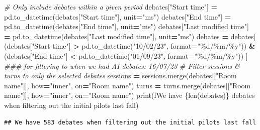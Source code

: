 \documentclass[
]{article}
\newenvironment{Shaded}{\begin{snugshade}}{\end{snugshade}}
\newcommand{\BuiltInTok}[1]{#1}
\newcommand{\CommentTok}[1]{\textcolor[rgb]{0.56,0.35,0.01}{\textit{#1}}}
\newcommand{\NormalTok}[1]{#1}
\newcommand{\OperatorTok}[1]{\textcolor[rgb]{0.81,0.36,0.00}{\textbf{#1}}}
\newcommand{\SpecialCharTok}[1]{\textcolor[rgb]{0.00,0.00,0.00}{#1}}
\newcommand{\SpecialStringTok}[1]{\textcolor[rgb]{0.31,0.60,0.02}{#1}}
\newcommand{\StringTok}[1]{\textcolor[rgb]{0.31,0.60,0.02}{#1}}
\begin{document}
\begin{Shaded}
\begin{Highlighting}[]
\CommentTok{\# Only include debates within a given period}
\NormalTok{debates[}\StringTok{"Start time"}\NormalTok{] }\OperatorTok{=}\NormalTok{ pd.to\_datetime(debates[}\StringTok{"Start time"}\NormalTok{], unit}\OperatorTok{=}\StringTok{"ms"}\NormalTok{)}
\NormalTok{debates[}\StringTok{"End time"}\NormalTok{] }\OperatorTok{=}\NormalTok{ pd.to\_datetime(debates[}\StringTok{"End time"}\NormalTok{], unit}\OperatorTok{=}\StringTok{"ms"}\NormalTok{)}
\NormalTok{debates[}\StringTok{"Last modified time"}\NormalTok{] }\OperatorTok{=}\NormalTok{ pd.to\_datetime(debates[}\StringTok{"Last modified time"}\NormalTok{], unit}\OperatorTok{=}\StringTok{"ms"}\NormalTok{)}
\NormalTok{debates }\OperatorTok{=}\NormalTok{ debates[}
\NormalTok{    (debates[}\StringTok{"Start time"}\NormalTok{] }\OperatorTok{\textgreater{}}\NormalTok{ pd.to\_datetime(}\StringTok{"10/02/23"}\NormalTok{, }\BuiltInTok{format}\OperatorTok{=}\StringTok{"}\SpecialCharTok{\%d}\StringTok{/\%m/\%y"}\NormalTok{)) }\OperatorTok{\&}
\NormalTok{    (debates[}\StringTok{"End time"}\NormalTok{] }\OperatorTok{\textless{}}\NormalTok{ pd.to\_datetime(}\StringTok{"01/09/23"}\NormalTok{, }\BuiltInTok{format}\OperatorTok{=}\StringTok{"}\SpecialCharTok{\%d}\StringTok{/\%m/\%y"}\NormalTok{))}
\NormalTok{]}
\CommentTok{\#\#\# for filtering to when we had AI debates: 16/07/23}
\CommentTok{\# Filter sessions \& turns to only the selected debates}
\NormalTok{sessions }\OperatorTok{=}\NormalTok{ sessions.merge(debates[[}\StringTok{"Room name"}\NormalTok{]], how}\OperatorTok{=}\StringTok{"inner"}\NormalTok{, on}\OperatorTok{=}\StringTok{"Room name"}\NormalTok{)}
\NormalTok{turns }\OperatorTok{=}\NormalTok{ turns.merge(debates[[}\StringTok{"Room name"}\NormalTok{]], how}\OperatorTok{=}\StringTok{"inner"}\NormalTok{, on}\OperatorTok{=}\StringTok{"Room name"}\NormalTok{)}
\BuiltInTok{print}\NormalTok{(}\SpecialStringTok{f\textquotesingle{}We have }\SpecialCharTok{\{}\BuiltInTok{len}\NormalTok{(debates)}\SpecialCharTok{\}}\SpecialStringTok{ debates when filtering out the initial pilots last fall\textquotesingle{}}\NormalTok{)}
\end{Highlighting}
\end{Shaded}

\begin{verbatim}
## We have 583 debates when filtering out the initial pilots last fall
\end{verbatim}
\end{document}
